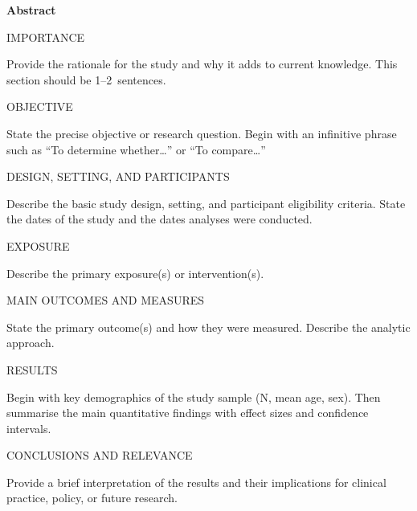 \documentclass[10pt, letterpaper]{article}
\newcommand{\abslabel}[1]{%
  {\vspace{4pt}\noindent\sffamily\fontseries{b}\selectfont\fontsize{8.5}{10}\selectfont #1\enspace}%
}
\newcommand{\absrule}{%
  \vspace{3pt}\noindent{\color{jamacrimson}\rule{0.62\textwidth}{0.4pt}}\vspace{3pt}%
}
\begin{document}
\noindent
\begin{minipage}[t]{0.62\textwidth}
{\sffamily\bfseries\fontsize{11}{13}\selectfont\color{jamacrimson} Abstract\par}
\vspace{4pt}

\abslabel{IMPORTANCE}
{\fontsize{9}{11.5}\selectfont
Provide the rationale for the study and why it adds to current knowledge.
This section should be 1--2~sentences.\par}

\absrule

\abslabel{OBJECTIVE}
{\fontsize{9}{11.5}\selectfont
State the precise objective or research question. Begin with an infinitive
phrase such as ``To determine whether\ldots'' or ``To compare\ldots''\par}

\absrule

\abslabel{DESIGN, SETTING, AND PARTICIPANTS}
{\fontsize{9}{11.5}\selectfont
Describe the basic study design, setting, and participant eligibility
criteria. State the dates of the study and the dates analyses were
conducted.\par}

\absrule

\abslabel{EXPOSURE}
{\fontsize{9}{11.5}\selectfont
Describe the primary exposure(s) or intervention(s).\par}

\absrule

\abslabel{MAIN OUTCOMES AND MEASURES}
{\fontsize{9}{11.5}\selectfont
State the primary outcome(s) and how they were measured. Describe the
analytic approach.\par}

\absrule

\abslabel{RESULTS}
{\fontsize{9}{11.5}\selectfont
Begin with key demographics of the study sample (N, mean age, sex).
Then summarise the main quantitative findings with effect sizes and
confidence intervals.\par}

\absrule

\abslabel{CONCLUSIONS AND RELEVANCE}
{\fontsize{9}{11.5}\selectfont
Provide a brief interpretation of the results and their implications
for clinical practice, policy, or future research.\par}

\vspace{4pt}
\noindent{\color{jamalightgray}\rule{0.62\textwidth}{0.4pt}}


\end{minipage}%
\end{document}

